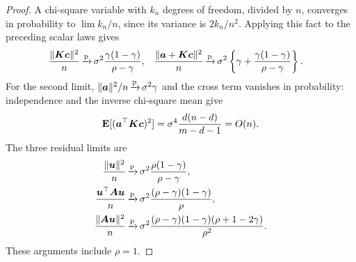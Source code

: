\documentclass{article}
\theoremstyle{plain} %
\theoremstyle{definition} %
\theoremstyle{definition} %
\begin{document}
\begin{proof}
A chi-square variable with $k_n$ degrees of freedom, divided by $n$,
converges in probability to $\lim k_n/n$, since its variance is $2k_n/n^2$.
Applying this fact to the preceding scalar laws gives
\begin{align}
    \frac{\lVert\boldsymbol{K}\boldsymbol{c}\rVert^2}{n}
       &{\,\smash{\xrightarrow{\mathrm{p}}}}\,\sigma^2\frac{\gamma(1-\gamma)}{\rho-\gamma},
    &
    \frac{\lVert\boldsymbol{a}+\boldsymbol{K}\boldsymbol{c}\rVert^2}{n}
       &{\,\smash{\xrightarrow{\mathrm{p}}}}\,\sigma^2\left\{\gamma+
              \frac{\gamma(1-\gamma)}{\rho-\gamma}\right\}.
    \label{eq:Gaussian-K-traces}
\end{align}
For the second limit, $\lVert\boldsymbol{a}\rVert^2/n{\,\smash{\xrightarrow{\mathrm{p}}}}\,\sigma^2\gamma$ and the
cross term vanishes in probability: independence and the inverse
chi-square mean give
\begin{align*}
    {\mathbf{E}}[(\boldsymbol{a}^\top\boldsymbol{K}\boldsymbol{c})^2]
       =\sigma^4\frac{d(n-d)}{m-d-1}=O(n).
\end{align*}
The three residual limits are
\begin{align}
    \frac{\lVert\boldsymbol{u}\rVert^2}{n}
    &{\,\smash{\xrightarrow{\mathrm{p}}}}\, \sigma^2\frac{\rho(1-\gamma)}{\rho-\gamma},
    \label{eq:Gaussian-u-limit}\\
    \frac{\boldsymbol{u}^\top\boldsymbol{A}\boldsymbol{u}}{n}
    &{\,\smash{\xrightarrow{\mathrm{p}}}}\, \sigma^2\frac{(\rho-\gamma)(1-\gamma)}{\rho},\notag\\
    \frac{\lVert\boldsymbol{A}\boldsymbol{u}\rVert^2}{n}
    &{\,\smash{\xrightarrow{\mathrm{p}}}}\, \sigma^2\frac{(\rho-\gamma)(1-\gamma)(\rho+1-2\gamma)}{\rho^2}.
    \notag
\end{align}
These arguments include $\rho=1$.


\end{proof}
\end{document}
